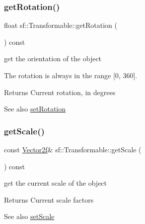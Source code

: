 \subsubsection{\texorpdfstring{getRotation()}{getRotation()}}
{\footnotesize\ttfamily float sf\+::\+Transformable\+::get\+Rotation (\begin{DoxyParamCaption}{ }\end{DoxyParamCaption}) const}



get the orientation of the object 

The rotation is always in the range \mbox{[}0, 360\mbox{]}.

\begin{DoxyReturn}{Returns}
Current rotation, in degrees
\end{DoxyReturn}
\begin{DoxySeeAlso}{See also}
\mbox{\hyperlink{classsf_1_1_transformable_a32baf2bf1a74699b03bf8c95030a38ed}{set\+Rotation}} \begin{DoxyVerb}\end{DoxyVerb}
 
\end{DoxySeeAlso}
\mbox{\label{classsf_1_1_transformable_a73819fdea80ca8a06fad8a0067b4588c}} 
\subsubsection{\texorpdfstring{getScale()}{getScale()}}
{\footnotesize\ttfamily const \mbox{\hyperlink{classsf_1_1_vector2}{Vector2f}}\& sf\+::\+Transformable\+::get\+Scale (\begin{DoxyParamCaption}{ }\end{DoxyParamCaption}) const}



get the current scale of the object 

\begin{DoxyReturn}{Returns}
Current scale factors
\end{DoxyReturn}
\begin{DoxySeeAlso}{See also}
\mbox{\hyperlink{classsf_1_1_transformable_aaec50b46b3f41b054763304d1e727471}{set\+Scale}} \begin{DoxyVerb}\end{DoxyVerb}
 
\end{DoxySeeAlso}
\mbox{\label{classsf_1_1_transformable_a7f7c3f0bab3f162b13613904fbdbb9ad}} 
